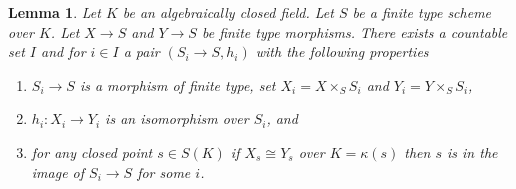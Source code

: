 \documentclass{stacks-project}
\theoremstyle{plain}
\newtheorem{lemma}[subsection]{Lemma}
\theoremstyle{definition}
\theoremstyle{remark}
\numberwithin{equation}{subsection}
\begin{document}
\begin{lemma}
\label{lemma-countable-isos}
Let $K$ be an algebraically closed field.
Let $S$ be a finite type scheme over $K$.
Let $X \to S$ and $Y \to S$ be finite type morphisms.
There exists a countable set $I$ and for $i \in I$ a pair
$(S_i \to S, h_i)$ with the following properties
\begin{enumerate}
\item $S_i \to S$ is a morphism of finite type, set
$X_i = X \times_S S_i$ and $Y_i = Y \times_S S_i$,
\item $h_i : X_i \to Y_i$ is an isomorphism over $S_i$, and
\item for any closed point $s \in S(K)$ if $X_s \cong Y_s$
over $K = \kappa(s)$ then $s$ is in the image of $S_i \to S$
for some $i$.
\end{enumerate}
\end{lemma}
\end{document}
